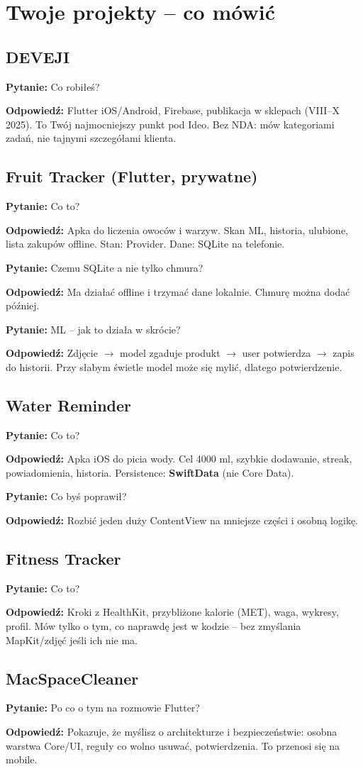\documentclass[11pt,a4paper]{article}
\newcommand{\pyt}[1]{\par\medskip\noindent\textbf{Pytanie:} #1\par}
\newcommand{\odp}[1]{\noindent\textbf{Odpowiedź:} #1\par}
\begin{document}
\section{Twoje projekty -- co mówić}

\subsection{DEVEJI}
\pyt{Co robiłeś?}
\odp{Flutter iOS/Android, Firebase, publikacja w sklepach (VIII--X 2025). To Twój najmocniejszy punkt pod Ideo. Bez NDA: mów kategoriami zadań, nie tajnymi szczegółami klienta.}

\subsection{Fruit Tracker (Flutter, prywatne)}
\pyt{Co to?}
\odp{Apka do liczenia owoców i warzyw. Skan ML, historia, ulubione, lista zakupów offline. Stan: Provider. Dane: SQLite na telefonie.}

\pyt{Czemu SQLite a nie tylko chmura?}
\odp{Ma działać offline i trzymać dane lokalnie. Chmurę można dodać później.}

\pyt{ML -- jak to działa w skrócie?}
\odp{Zdjęcie $\to$ model zgaduje produkt $\to$ user potwierdza $\to$ zapis do historii. Przy słabym świetle model może się mylić, dlatego potwierdzenie.}

\subsection{Water Reminder}
\pyt{Co to?}
\odp{Apka iOS do picia wody. Cel 4000 ml, szybkie dodawanie, streak, powiadomienia, historia. Persistence: \textbf{SwiftData} (nie Core Data).}

\pyt{Co byś poprawił?}
\odp{Rozbić jeden duży ContentView na mniejsze części i osobną logikę.}

\subsection{Fitness Tracker}
\pyt{Co to?}
\odp{Kroki z HealthKit, przybliżone kalorie (MET), waga, wykresy, profil. Mów tylko o tym, co naprawdę jest w kodzie -- bez zmyślania MapKit/zdjęć jeśli ich nie ma.}

\subsection{MacSpaceCleaner}
\pyt{Po co o tym na rozmowie Flutter?}
\odp{Pokazuje, że myślisz o architekturze i bezpieczeństwie: osobna warstwa Core/UI, reguły co wolno usuwać, potwierdzenia. To przenosi się na mobile.}
\end{document}
